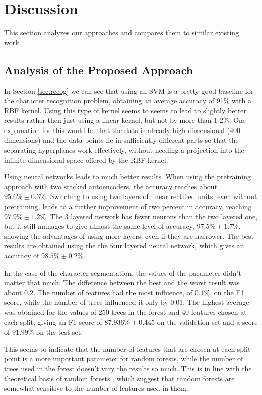 \section{Discussion}
This section analyzes our approaches and compares them to similar existing work.

\subsection{Analysis of the Proposed Approach}
In Section \ref{sec:recog} we can see that using an SVM is a pretty good baseline for the character recognition problem, obtaining an average accuracy of 91\% with a RBF kernel. Using this type of kernel seems to seems to lead to slightly better results rather then just using a linear kernel, but not by more than 1-2\%. One explanation for this would be that the data is already high dimensional (400 dimensions) and the data points lie in sufficiently different parts so that the separating hyperplanes work effectively, without needing a projection into the infinite dimensional space offered by the RBF kernel. 

Using neural networks leads to much better results. When using the pretraining approach with two stacked autoencoders, the accuracy reaches about $95.6\% \pm 0.3 \% $. Switching to using two layers of linear rectified units, even without pretraining, leads to a further improvement of two percent in accuracy, reaching $ 97.9\% \pm 1.2\% $. The 3 layered network has fewer neurons than the two layered one, but it still manages to give almost the same level of accuracy, $ 97.5\% \pm 1.7\% $, showing the advantages of using more layers, even if they are narrower. The best results are obtained using the the four layered neural network, which gives an accuracy of $ 98.5\% \pm 0.2\% $. 

In the case of the character segmentation, the values of the parameter didn't matter that much. The difference between the best and the worst result was about 0.2. The number of features had the most influence, of $ 0.1\% $, on the F1 score, while the number of trees influenced it only by 0.01. The highest average was obtained for the values of 250 trees in the forest and 40 features chosen at each split, giving an F1 score of $ 87.936\% \pm 0.445$ on the validation set and a score of $ 91.99\% $ on the test set.  

This seems to indicate that the number of features that are chosen at each split point is a more important parameter for random forests, while the number of trees used in the forest doesn't vary the results so much. This is in line with the theoretical basis of random forests \cite{breiman2001random}, which suggest that random forests are somewhat sensitive to the number of features used in them. 


